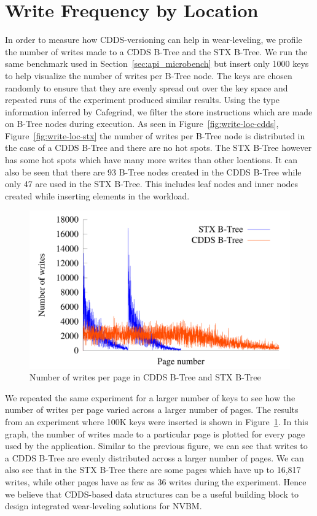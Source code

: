 \section{Write Frequency by Location}
In order to measure how CDDS-versioning can help in wear-leveling, we profile
the number of writes made to a CDDS B-Tree and the STX B-Tree. We run the same
benchmark used in Section~\ref{sec:api_microbench} but insert only 1000 keys to
help visualize the number of writes per B-Tree node. The keys are chosen
randomly to ensure that they are evenly spread out over the key space and
repeated runs of the experiment produced similar results.  Using the type
information inferred by Cafegrind, we filter the store instructions which are
made on B-Tree nodes during execution. As seen in
Figure~\ref{fig:write-loc-cdds}, Figure~\ref{fig:write-loc-stx} the number of
writes per B-Tree node is distributed in the case of a CDDS B-Tree and there
are no hot spots. The STX B-Tree however has some hot spots which have many
more writes than other locations. It can also be seen that there are 93 B-Tree
nodes created in the CDDS B-Tree while only 47 are used in the STX B-Tree. This
includes leaf nodes and inner nodes created while inserting elements in the
workload.

\begin{figure}[t]
\begin{center}
\includegraphics[width=0.7\columnwidth]{figs/wear-line}
\caption{Number of writes per page in CDDS B-Tree and STX B-Tree}
\label{fig:wear-line}
\end{center}
\end{figure}

We repeated the same experiment for a larger number of keys to see how the
number of writes per page varied across a larger number of pages. The results
from an experiment where 100K keys were inserted is shown in
Figure~\ref{fig:wear-line}. In this graph, the number of writes made to a
particular page is plotted for every page used by the application. Similar to
the previous figure, we can see that writes to a CDDS B-Tree are evenly
distributed across a larger number of pages. We can also see that in the
STX B-Tree there are some pages which have up to 16,817 writes, while other pages
have as few as 36 writes during the experiment. Hence we believe that
CDDS-based data structures can be a useful building block to design integrated
wear-leveling solutions for NVBM.
 
